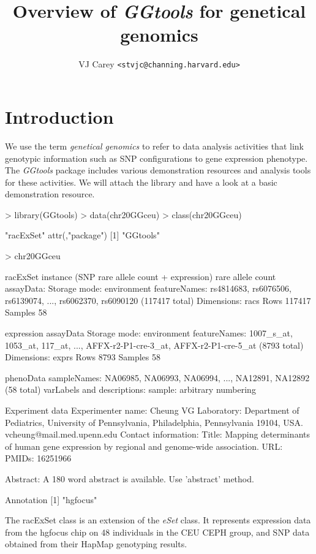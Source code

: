 \documentclass[12pt]{article}
\newcommand{\Rpackage}[1]{{\textit{#1}}}
\newcommand{\Rclass}[1]{{\textit{#1}}}
\begin{document}

\title{Overview of \Rpackage{GGtools} for genetical genomics}
\author{VJ Carey \texttt{<stvjc@channing.harvard.edu>}}
\maketitle

\section{Introduction}

We use the term \textit{genetical genomics} to refer to
data analysis activities that link genotypic information
such as SNP configurations to gene expression phenotype.
The \Rpackage{GGtools} package includes various
demonstration resources and analysis tools for these
activities.
We will attach the library and have a look at a basic
demonstration resource.
\begin{Schunk}
\begin{Sinput}
> library(GGtools)
> data(chr20GGceu)
> class(chr20GGceu)
\end{Sinput}
\begin{Soutput}
[1] "racExSet"
attr(,"package")
[1] "GGtools"
\end{Soutput}
\begin{Sinput}
> chr20GGceu
\end{Sinput}
\begin{Soutput}
racExSet instance (SNP rare allele count + expression)
rare allele count assayData:
  Storage mode: environment 
  featureNames: rs4814683, rs6076506, rs6139074, ..., rs6062370, rs6090120 (117417 total)
  Dimensions:
          racs
Rows    117417
Samples     58

expression assayData
  Storage mode: environment 
  featureNames: 1007_s_at, 1053_at, 117_at, ..., AFFX-r2-P1-cre-3_at, AFFX-r2-P1-cre-5_at (8793 total)
  Dimensions:
        exprs
Rows     8793
Samples    58

phenoData
  sampleNames: NA06985, NA06993, NA06994, ..., NA12891, NA12892 (58 total)
  varLabels and descriptions:
    sample: arbitrary numbering

Experiment data
  Experimenter name: Cheung VG 
  Laboratory: Department of Pediatrics, University of Pennsylvania, Philadelphia, Pennsylvania 19104, USA. vcheung@mail.med.upenn.edu 
  Contact information:  
  Title: Mapping determinants of human gene expression by regional and genome-wide association. 
  URL:  
  PMIDs: 16251966 

  Abstract: A 180 word abstract is available. Use 'abstract' method.

Annotation [1] "hgfocus"
\end{Soutput}
\end{Schunk}
The racExSet class is an extension of the
\Rclass{eSet} class.  It represents expression
data from the hgfocus chip on 48 individuals in the CEU
CEPH group, and SNP data obtained from their HapMap genotyping
results.
\end{document}
